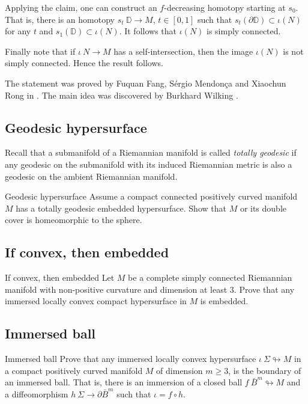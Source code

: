 Applying the claim, one can construct an $f$-decreasing homotopy starting at $s_0$.
That is,
there is an homotopy $s_t\:\mathbb D\to M$, $t\in [0,1]$ 
such that $s_t(\partial \mathbb D)\subset \iota(N)$ for any $t$ 
and $s_1(\mathbb D)\subset \iota(N)$.
It follows that $\iota(N)$ is simply connected.

Finally note that if $\iota\:N\to M$ has a self-intersection,
then the image
$\iota(N)$ is not simply connected.
Hence the result follows.\qeds


The statement was proved by 
Fuquan Fang, 
S\'ergio Mendon\c{c}a 
and Xiaochun Rong in \cite{FMR}.
The main idea was discovered by 
Burkhard Wilking \cite[see][]{wilking-2003}.

\subsection*{Geodesic hypersurface}
Recall that a submanifold of a Riemannian manifold is called \emph{totally geodesic} if any geodesic on the submanifold with its induced Riemannian metric is also a geodesic on the ambient Riemannian manifold.

\begin{pr}{\easy}{Geodesic hypersurface}\label{Geodesic hypersurface}
Assume a compact connected positively curved manifold $M$ has a totally geodesic embedded hypersurface.
Show that $M$ or its double cover is homeomorphic to the sphere.
\end{pr}

\subsection*{If convex, then embedded}

\begin{pr}{}{If convex, then embedded}\label{If convex then embedded} 
Let $M$ be a complete simply connected Riemannian manifold 
with non-positive curvature 
and dimension at least $3$.
Prove that any immersed locally convex
compact hypersurface in $M$ is embedded.
\end{pr}

\subsection*{Immersed ball\hard}

\begin{pr}{\hard}{Immersed ball}\label{Immersed ball}
Prove that any immersed locally convex
hypersurface $\iota\:\Sigma\looparrowright M$
in a compact positively curved manifold $M$ of dimension $m\ge 3$, is the boundary of an immersed ball. 
That is, there is an immersion of a closed ball $f\:\bar B^m\looparrowright M$ and a diffeomorphism $h\:\Sigma\to\partial \bar B^m$
such that $\iota=f\circ h$.
\end{pr}

